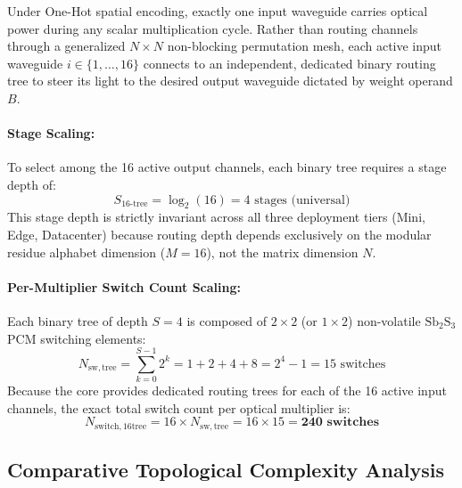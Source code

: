 \documentclass[journal]{IEEEtran}
\begin{document}
Under One-Hot spatial encoding, exactly one input waveguide carries optical power during any scalar multiplication cycle. Rather than routing channels through a generalized $N \times N$ non-blocking permutation mesh, each active input waveguide $i \in \{1, \dots, 16\}$ connects to an independent, dedicated binary routing tree to steer its light to the desired output waveguide dictated by weight operand $B$.

\paragraph{Stage Scaling:}
To select among the 16 active output channels, each binary tree requires a stage depth of:
\begin{equation}
S_{\mathrm{16\text{-}tree}} = \log_2(16) = 4 \text{ stages (universal)}
\end{equation}
This stage depth is strictly invariant across all three deployment tiers (Mini, Edge, Datacenter) because routing depth depends exclusively on the modular residue alphabet dimension ($M = 16$), not the matrix dimension $N$.

\paragraph{Per-Multiplier Switch Count Scaling:}
Each binary tree of depth $S = 4$ is composed of $2 \times 2$ (or $1 \times 2$) non-volatile $\mathrm{Sb_2S_3}$ PCM switching elements:
\begin{equation}
N_{\mathrm{sw,tree}} = \sum_{k=0}^{S-1} 2^k = 1 + 2 + 4 + 8 = 2^4 - 1 = 15 \text{ switches}
\end{equation}
Because the core provides dedicated routing trees for each of the 16 active input channels, the exact total switch count per optical multiplier is:
\begin{equation}
N_{\mathrm{switch,16tree}} = 16 \times N_{\mathrm{sw,tree}} = 16 \times 15 = \mathbf{240 \text{ switches}}
\end{equation}

\subsection{\textbf{Comparative Topological Complexity Analysis}}
\end{document}
